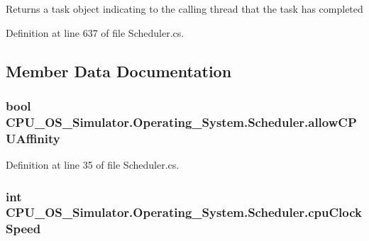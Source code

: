 \begin{DoxyReturn}{Returns}
a task object indicating to the calling thread that the task has completed
\end{DoxyReturn}


Definition at line 637 of file Scheduler.\+cs.



\subsection{Member Data Documentation}
\hypertarget{class_c_p_u___o_s___simulator_1_1_operating___system_1_1_scheduler_a732d4b0d95cad3e280f9b69dd4f9f7c4}{}
\subsubsection[{allow\+C\+P\+U\+Affinity}]{\setlength{\rightskip}{0pt plus 5cm}bool C\+P\+U\+\_\+\+O\+S\+\_\+\+Simulator.\+Operating\+\_\+\+System.\+Scheduler.\+allow\+C\+P\+U\+Affinity\hspace{0.3cm}{\ttfamily [private]}}\label{class_c_p_u___o_s___simulator_1_1_operating___system_1_1_scheduler_a732d4b0d95cad3e280f9b69dd4f9f7c4}


Definition at line 35 of file Scheduler.\+cs.

\hypertarget{class_c_p_u___o_s___simulator_1_1_operating___system_1_1_scheduler_ae1829f5340f76cad2150c9e1f9ab3c69}{}
\subsubsection[{cpu\+Clock\+Speed}]{\setlength{\rightskip}{0pt plus 5cm}int C\+P\+U\+\_\+\+O\+S\+\_\+\+Simulator.\+Operating\+\_\+\+System.\+Scheduler.\+cpu\+Clock\+Speed\hspace{0.3cm}{\ttfamily [private]}}\label{class_c_p_u___o_s___simulator_1_1_operating___system_1_1_scheduler_ae1829f5340f76cad2150c9e1f9ab3c69}



